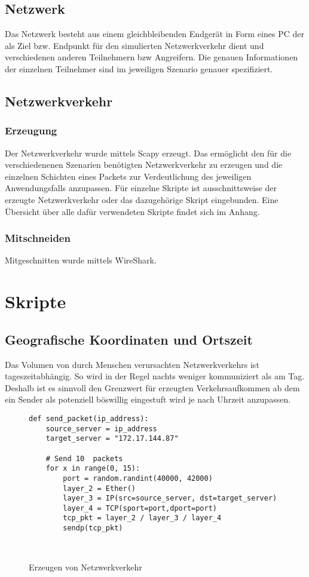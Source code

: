 \subsection{Netzwerk}
Das Netzwerk besteht aus einem gleichbleibenden Endgerät in Form eines PC der als Ziel bzw. Endpunkt für den simulierten Netzwerkverkehr dient und verschiedenen anderen Teilnehmern bzw Angreifern. Die genauen Informationen der einzelnen Teilnehmer sind im jeweiligen Szenario genauer spezifiziert.
\subsection{Netzwerkverkehr}
\subsubsection{Erzeugung}
Der Netzwerkverkehr wurde mittels Scapy erzeugt. Das ermöglicht den für die verschiedenenen Szenarien benötigten Netzwerkverkehr zu erzeugen und die einzelnen Schichten eines Packets zur Verdeutlichung des jeweiligen Anwendungsfalls anzupassen. Für einzelne Skripte ist ausschnittsweise der erzeugte Netzwerkverkehr oder das dazugehörige Skript eingebunden. Eine Übersicht über alle dafür verwendeten Skripte findet sich im Anhang.
\subsubsection{Mitschneiden}
Mitgeschnitten wurde mittels WireShark.

\section{Skripte}
\subsection{Geografische Koordinaten und Ortszeit}
Das Volumen von durch Menschen verursachten Netzwerkverkehrs ist tageszeitabhängig. So wird in der Regel nachts weniger kommuniziert als am Tag.  Deshalb ist es sinnvoll den Grenzwert für erzeugten Verkehrsaufkommen ab dem ein Sender als potenziell böswillig eingestuft wird je nach Uhrzeit anzupassen.\\
\begin{figure}[h!]

\begin{lstlisting}
def send_packet(ip_address):
    source_server = ip_address
    target_server = "172.17.144.87"

    # Send 10  packets
    for x in range(0, 15):
        port = random.randint(40000, 42000)
        layer_2 = Ether()
        layer_3 = IP(src=source_server, dst=target_server)
        layer_4 = TCP(sport=port,dport=port)
        tcp_pkt = layer_2 / layer_3 / layer_4
        sendp(tcp_pkt)
\end{lstlisting}
\caption{Erzeugen von Netzwerkverkehr}\\
\end{figure}

